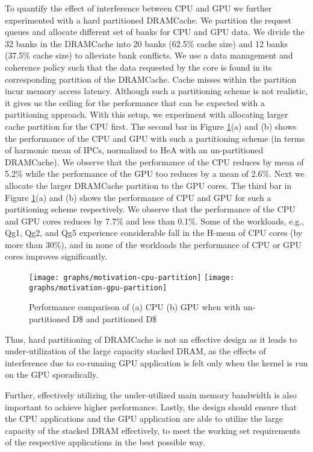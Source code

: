 \par To quantify the effect of interference between CPU and GPU we further experimented with a hard partitioned DRAMCache. We partition the request queues and allocate different set of banks for CPU and GPU data. We divide the 32 banks in the DRAMCache into 20 banks (62.5\% cache size) and 12 banks (37.5\% cache size) to alleviate bank conflicts. We use a data management and coherence policy such that the data requested by the core is found in its corresponding partition of the DRAMCache. Cache misses within the partition incur memory access latency. Although such a partitioning scheme is not realistic, it gives us the ceiling for the performance that can be expected with a partitioning approach. With this setup, we experiment with allocating larger cache partition for the CPU first. The second bar in Figure \ref{fig:motivation-partition}(a) and (b) shows the performance of the CPU and GPU with such a partitioning scheme (in terms of harmonic mean of IPCs, normalized to HeA with an un-partitioned DRAMCache). We observe that the performance of the CPU reduces by mean of 5.2\% while the performance of the GPU too reduces by a mean of 2.6\%.
Next we allocate the larger DRAMCache partition to the GPU cores. The third bar in Figure \ref{fig:motivation-partition}(a) and (b) shows the performance of CPU and GPU for such a partitioning scheme respectively. We observe that the performance of the CPU and GPU cores reduces by 7.7\% and less than 0.1\%. Some of the workloads, e.g., Qg1, Qg2, and Qg5 experience considerable fall in the H-mean of CPU cores (by more than 30\%), and in none of the workloads the performance of CPU or GPU cores improves significantly.
\begin{figure}[htbp]
	\centering
	\texttt{[image: graphs/motivation-cpu-partition]}
	\texttt{[image: graphs/motivation-gpu-partition]}
	\caption{Performance comparison of (a) CPU (b) GPU when with un-partitioned D\$ and partitioned D\$}
	\label{fig:motivation-partition}
\end{figure}
Thus, hard partitioning of DRAMCache is not an effective design as it leads to under-utilization of the large capacity 
stacked DRAM, as the effects of interference due to co-running GPU application is felt only when the kernel is run on the GPU sporadically.

Further, effectively utilizing the under-utilized main memory bandwidth \cite{micro-refresh, mainak-hpca, bear}
is also important to achieve higher performance.  Lastly, the design should ensure that the CPU applications and the 
GPU application are able to utilize the large capacity of the stacked DRAM effectively, to meet the working set 
requirements of the respective applications in the best possible way.

